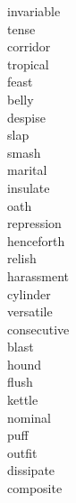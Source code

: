 \documentclass[b5paper, 11pt]{ctexart}
\begin{document}
\begin{multicols*}{3}
\begin{description}
\item[invariable]

\item[tense]

\item[corridor]

\item[tropical]

\item[feast]

\item[belly]

\item[despise]

\item[slap]

\item[smash]

\item[marital]

\item[insulate]

\item[oath]

\item[repression]

\item[henceforth]

\item[relish]

\item[harassment]

\item[cylinder]

\item[versatile]

\item[consecutive]

\item[blast]

\item[hound]

\item[flush]

\item[kettle]

\item[nominal]

\item[puff]

\item[outfit]

\item[dissipate]

\item[composite]


\end{description}
\end{multicols*}
\end{document}
